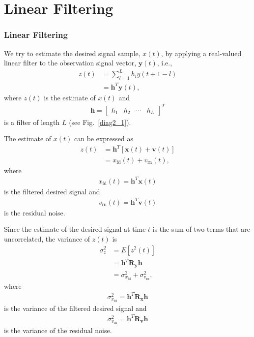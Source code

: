 \documentclass[10pt,pdflatex,headrule,landscape]{beamer}
\begin{document}
\section{Linear Filtering}
\begin{frame}
  \frametitle{Linear Filtering}
We try to estimate the desired signal sample, $x(t)$, by applying a real-valued linear filter to the observation signal vector, $\mathbf{y}(t)$, i.e.,
\begin{align}
\label{C2-z(t)}
 z(t) &= \sum_{l=1}^{L} h_l y(t+1-l) \\
 &= \mathbf{h}^T \mathbf{y}(t), \nonumber
\end{align}
where $z(t)$ is the estimate of $x(t)$ and
\begin{eqnarray}
 \mathbf{h} = \left[ \begin{array}{cccc} h_1 & h_2 & \cdots & h_{L} \end{array} \right]^T
\end{eqnarray}
is a filter of length $L$ (see Fig.~\ref{diag2_1}).

\end{frame}
\begin{frame}[allowframebreaks]

The estimate of $x(t)$ can be expressed as
\begin{align}
\label{C2-z(t)-2}
 z(t) &= \mathbf{h}^T \left[ \mathbf{x}(t) + \mathbf{v}(t) \right] \\
 &= x_{\mathrm{fd}}(t) + v_{\mathrm{rn}}(t), \nonumber
\end{align}
where
\begin{eqnarray}
 x_{\mathrm{fd}}(t) = \mathbf{h}^T \mathbf{x}(t)
\end{eqnarray}
is the filtered desired signal and
\begin{eqnarray}
 v_{\mathrm{rn}}(t) = \mathbf{h}^T \mathbf{v}(t)
\end{eqnarray}
is the residual noise.

Since the estimate of the desired signal at time $t$ is the sum of two terms that are uncorrelated, the variance of $z(t)$ is
\begin{align}
\label{C2-var-z(t)}
 \sigma_z^2 &= E\left[ z^2(t) \right] \\
 &= \mathbf{h}^T \mathbf{R}_{\mathbf{y}} \mathbf{h} \nonumber \\
 &= \sigma_{x_{\mathrm{fd}}}^2 + \sigma_{v_{\mathrm{rn}}}^2, \nonumber
\end{align}
where
\begin{eqnarray}
\label{C2-var-x-fd(t)}
 \sigma_{x_{\mathrm{fd}}}^2 = \mathbf{h}^T \mathbf{R}_{\mathbf{x}} \mathbf{h}
\end{eqnarray}
is the variance of the filtered desired signal and
\begin{eqnarray}
\label{C2-var-v-rn(t)}
 \sigma_{v_{\mathrm{rn}}}^2 = \mathbf{h}^T \mathbf{R}_{\mathbf{v}} \mathbf{h}
\end{eqnarray}
is the variance of the residual noise.


\end{frame}
\end{document}
